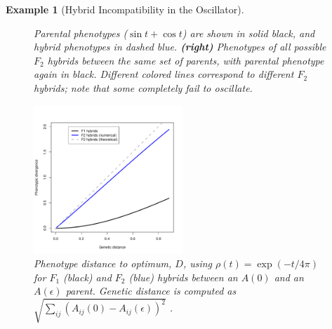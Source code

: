\documentclass{article}
\newcommand{\plr}[1]{\todo[color=blue!25]{#1}}
\newcommand{\plri}[1]{{\color{blue}\it #1}}
\newcommand{\plr}[1]{{\color{blue}\it #1}}
\newcommand{\plri}[1]{\plr{#1}}
\newcommand{\1}{\mathbbm{1}}
\newtheorem{example}{Example}
\begin{document}
\begin{example}[Hybrid Incompatibility in the Oscillator]
\begin{figure}[H]
{    %
    Parental phenotypes ($\sin t + \cos t$) are shown in solid black, and hybrid phenotypes in dashed blue.
    \textbf{(right)} Phenotypes of all possible $F_2$ hybrids between the same set of parents,
    with parental phenotype again in black.
    Different colored lines correspond to different $F_2$ hybrids;
    note that some completely fail to oscillate.
  } \label{fig:hybs}
\end{figure}

  \begin{figure}[H]
    \centering
    \includegraphics[width=0.5\textwidth]{examples/F2_vs_F1_divergence_tau0}
    \caption{Phenotype distance to optimum, $D$, using $\rho(t) = \exp(-t/4\pi)$
    for $F_1$ (black) and $F_2$ (blue) hybrids between an $A(0)$ and an $A(\epsilon)$ parent. Genetic distance is computed as 
    $\sqrt{\sum_{ij} (A_{ij}(0) - A_{ij}(\epsilon))^2}$
    .}
    \label{fig:osc_incompat}
  \end{figure}
\end{example}
\end{document}
